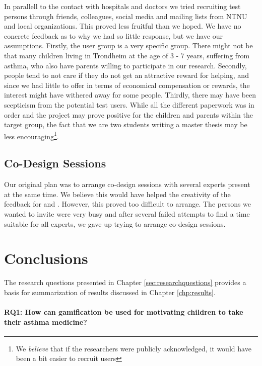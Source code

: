 In parallell to the contact with hospitals and doctors we tried recruiting test persons through friends, colleagues, social media and mailing lists from NTNU and local organizations. This proved less fruitful than we hoped. We have no concrete feedback as to why we had so little response, but we have our assumptions. Firstly, the user group is a very specific group. There might not be that many children living in Trondheim at the age of 3 - 7 years, suffering from asthma, who also have parents willing to participate in our research. Secondly, people tend to not care if they do not get an attractive reward for helping, and since we had little to offer in terms of economical compensation or rewards, the interest might have withered away for some people. Thirdly, there may have been scepticism from the potential test users. While all the different paperwork was in order and the project may prove positive for the children and parents within the target group, the fact that we are two students writing a master thesis may be less encouraging\footnote{We \emph{believe} that if the researchers were publicly acknowledged, it would have been a bit easier to recruit users}.


\subsection{Co-Design Sessions}
\label{sec:codesignsessionsdifficulties}
Our original plan was to arrange co-design sessions with several experts present at the same time. We believe this would have helped the creativity of the feedback for \app{} and \ab{}. However, this proved too difficult to arrange. The persons we wanted to invite were very busy and after several failed attempts to find a time suitable for all experts, we gave up trying to arrange co-design sessions. 

  
\section{Conclusions}
\label{conlusions}

The research questions presented in Chapter \ref{sec:researchquestions} provides a basis for summarization of results discussed in Chapter \ref{chp:results}. 

\paragraph{RQ1: How can gamification be used for motivating children to take their asthma medicine?}



